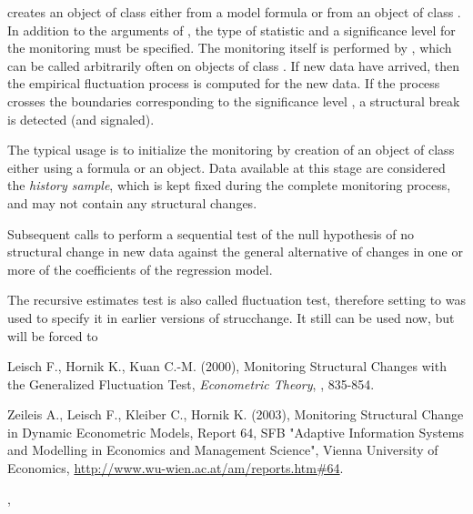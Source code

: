 \begin{Details}\relax
{} creates an object of class  either
from a model formula or from an object of class . In
addition to the arguments of , the type of statistic
and a significance level for the monitoring must be specified. The
monitoring itself is performed by , which can be
called arbitrarily often on objects of class . If new
data have arrived, then the empirical fluctuation process is computed
for the new data. If the process crosses the boundaries corresponding
to the significance level , a structural break is detected
(and signaled).

The typical usage is to initialize the monitoring by creation of an
object of class  either using a formula or an
 object. Data available at this stage are considered the
\emph{history sample}, which is kept fixed during the complete
monitoring process, and may not contain any structural changes.

Subsequent calls to  perform a sequential test of the
null hypothesis of no structural change in new data against the
general alternative of changes in one or more of the coefficients of
the regression model.

The recursive
estimates test is also called fluctuation test, therefore setting 
to  was used to specify it in earlier versions of
strucchange. It still can be used now, but will be forced to \end{Details}
\begin{References}\relax
Leisch F., Hornik K., Kuan C.-M. (2000), Monitoring
Structural Changes with the Generalized Fluctuation Test,
\emph{Econometric Theory}, , 835-854.

Zeileis A., Leisch F., Kleiber C., Hornik K. (2003), Monitoring Structural Change
in Dynamic Econometric Models, Report 64, SFB "Adaptive Information Systems and
Modelling in Economics and Management Science", Vienna University of Economics,
\url{http://www.wu-wien.ac.at/am/reports.htm#64}.\end{References}
\begin{SeeAlso}\relax
{}, \end{SeeAlso}
